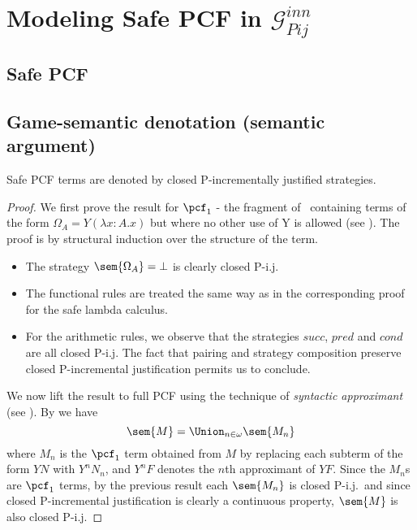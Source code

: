 \section{Modeling Safe PCF in $\mathcal{G}_{Pij}^{inn}$}

\subsection{Safe PCF}


\subsection{Game-semantic denotation (semantic argument)}

\begin{proposition}
\label{prop:safepcf_closedpij} Safe PCF terms are denoted by closed
P-incrementally justified strategies.
\end{proposition}
\begin{proof}
We first prove the result for $\pcf_1$ - the fragment of \pcf\
containing terms of the form $\Omega_A = Y (\lambda x : A.x)$ but
where no other use of Y is allowed (see
\cite{abramsky:game-semantics-tutorial}). The proof is by structural
induction over the structure of the term.
\begin{itemize}
\item The strategy $\sem{\Omega_A} = \bot$ is
clearly closed P-i.j.

\item The functional rules are treated the same way as in the
corresponding proof for the safe lambda calculus.

\item For the arithmetic rules, we observe that the strategies
$succ$, $pred$ and $cond$ are all closed P-i.j. The fact that
pairing and strategy composition preserve closed P-incremental
justification permits us to conclude.
\end{itemize}

We now lift the result to full PCF using the technique of
\emph{syntactic approximant} (see
\cite{abramsky:game-semantics-tutorial}). By \cite[lemma
16]{abramsky:game-semantics-tutorial} we have
$$ \sem{M} = \Union_{n\in\omega} \sem{M_n}$$
where $M_n$ is the $\pcf_1$ term obtained from $M$ by replacing each
subterm of the form $Y N$ with $Y^n N_n$, and $Y^n F$ denotes the
$n$th approximant of $Y F$. Since the $M_n$s are $\pcf_1$ terms, by
the previous result each $\sem{M_n}$ is closed P-i.j.\ and since
closed P-incremental justification is clearly a continuous property,
$\sem{M}$ is also closed P-i.j.
\end{proof}



